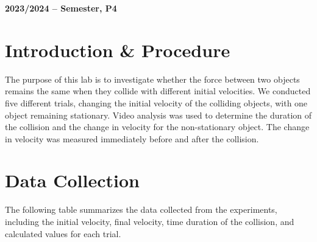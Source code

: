 \documentclass[12pt]{article}
\begin{document}
\begin{center}
    \large \bf 2023/2024 --  Semester, P4
\end{center}

\thispagestyle{empty}

\setcounter{page}{0}

\newpage

\tableofcontents 

\newpage

\section{Introduction \& Procedure}

The purpose of this lab is to investigate whether the force between two objects remains the same when they collide with different initial velocities. We conducted five different trials, changing the initial velocity of the colliding objects, with one object remaining stationary. Video analysis was used to determine the duration of the collision and the change in velocity for the non-stationary object. The change in velocity was measured immediately before and after the collision.

\section{Data Collection}

The following table summarizes the data collected from the experiments, including the initial velocity, final velocity, time duration of the collision, and calculated values for each trial.
\end{document}
